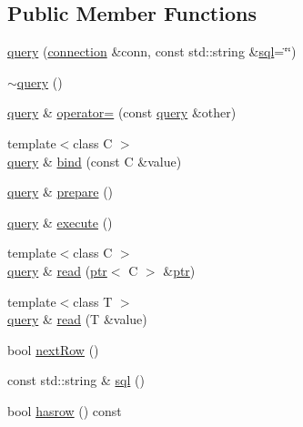 \subsection*{Public Member Functions}
\begin{DoxyCompactItemize}
\item 
\hyperlink{classdbo_1_1query_ac19a74e69ad4218112831283f5f0df49}{query} (\hyperlink{classdbo_1_1connection}{connection} \&conn, const std\+::string \&\hyperlink{classdbo_1_1query_a3f8523a194010647409c1d088a873c2b}{sql}=\char`\"{}\char`\"{})
\item 
\hyperlink{classdbo_1_1query_af479777fb57fbf7f857be5369d1c7241}{$\sim$query} ()
\item 
\hyperlink{classdbo_1_1query}{query} \& \hyperlink{classdbo_1_1query_a66350ea5d7bb84e7bdf3499a58afb0c3}{operator=} (const \hyperlink{classdbo_1_1query}{query} \&other)
\item 
{\footnotesize template$<$class C $>$ }\\\hyperlink{classdbo_1_1query}{query} \& \hyperlink{classdbo_1_1query_afc649b97327cf3447938d907251c77d4}{bind} (const C \&value)
\item 
\hyperlink{classdbo_1_1query}{query} \& \hyperlink{classdbo_1_1query_a29e671372b485030cf6dd1ddf6eb9562}{prepare} ()
\item 
\hyperlink{classdbo_1_1query}{query} \& \hyperlink{classdbo_1_1query_add1b7ef5fb795f0cc4c8e026374dde06}{execute} ()
\item 
{\footnotesize template$<$class C $>$ }\\\hyperlink{classdbo_1_1query}{query} \& \hyperlink{classdbo_1_1query_a2a5455a6e17b8807a1c8b8dfddcf9902}{read} (\hyperlink{classdbo_1_1ptr}{ptr}$<$ C $>$ \&\hyperlink{classdbo_1_1ptr}{ptr})
\item 
{\footnotesize template$<$class T $>$ }\\\hyperlink{classdbo_1_1query}{query} \& \hyperlink{classdbo_1_1query_a4b1687876a062d4c8f914bec512e1b36}{read} (T \&value)
\item 
bool \hyperlink{classdbo_1_1query_ae637eeb9728436f0e67d365ac5f85ae1}{next\+Row} ()
\item 
const std\+::string \& \hyperlink{classdbo_1_1query_a3f8523a194010647409c1d088a873c2b}{sql} ()
\item 
bool \hyperlink{classdbo_1_1query_a4b48b4d659f8377cea9976bc9506e354}{hasrow} () const 
\end{DoxyCompactItemize}
